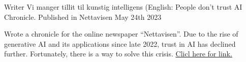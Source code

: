 

\begin{cventries}

  \cventry
    {Writer} %
    {Vi manger tillit til kunstig intelligens (English: People don't trust AI} %
    {Chronicle. Published in Nettavisen} %
    {May 24th 2023} %
    {
      \begin{cvitems} %
        \item {Wrote a chronicle for the online newspaper ``Nettavisen''. Due to the rise of generative AI and its applications since late 2022, trust in AI has declined further. Fortunately, there is a way to solve this crisis. \href{https://www.nettavisen.no/norsk-debatt/vi-mangler-tillit-til-kunstig-intelligens/o/5-95-1109936}{Clicl here for link.}}
      \end{cvitems}
    }
\end{cventries}
